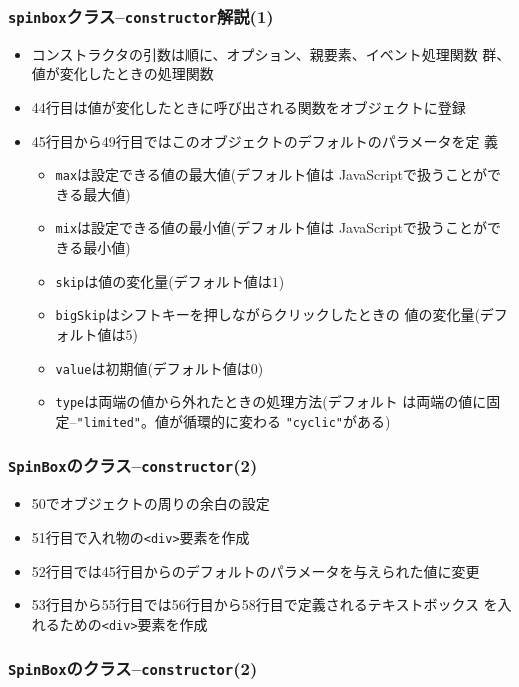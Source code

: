 \begin{frame}[containsverbatim]
  \frametitle{\texttt{spinbox}クラス--\texttt{constructor}解説(1)}
\begin{itemize}
 \item コンストラクタの引数は順に、オプション、親要素、イベント処理関数
       群、値が変化したときの処理関数
 \item 44行目は値が変化したときに呼び出される関数をオブジェクトに登録
 \item 45行目から49行目ではこのオブジェクトのデフォルトのパラメータを定
       義
       \begin{itemize}
        \item \texttt{max}は設定できる値の最大値(デフォルト値は
              JavaScriptで扱うことができる最大値)
        \item \texttt{mix}は設定できる値の最小値(デフォルト値は
              JavaScriptで扱うことができる最小値)
        \item \texttt{skip}は値の変化量(デフォルト値は$1$)
        \item \texttt{bigSkip}はシフトキーを押しながらクリックしたときの
              値の変化量(デフォルト値は$5$)
        \item \texttt{value}は初期値(デフォルト値は$0$)
        \item \texttt{type}は両端の値から外れたときの処理方法(デフォルト
              は両端の値に固定--\texttt{"limited"}。値が循環的に変わる
              \texttt{"cyclic"}がある)
       \end{itemize}
\end{itemize}
 \end{frame}
 \begin{frame}[containsverbatim]
  \frametitle{\texttt{SpinBox}のクラス--\texttt{constructor}(2)}
 \begin{itemize}
  \item 50でオブジェクトの周りの余白の設定
  \item 51行目で入れ物の\texttt{<div>}要素を作成
 \item 52行目では45行目からのデフォルトのパラメータを与えられた値に変更
 \item 53行目から55行目では56行目から58行目で定義されるテキストボックス
       を入れるための\texttt{<div>}要素を作成
 \end{itemize}
 \end{frame}
 \begin{frame}[containsverbatim]
  \frametitle{\texttt{SpinBox}のクラス--\texttt{constructor}(2)}
 \end{frame}
